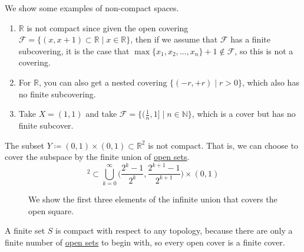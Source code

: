   \begin{example}
    \label{ex:non-compact-spaces}
    We show some examples of non-compact spaces. 
    \begin{enumerate}
      \item $\mathbb{R}$ is not compact since given the open covering $\mathcal{F} = \{ (x, x + 1) \subset \mathbb{R} \mid x \in \mathbb{R} \}$, then if we assume that $\mathcal{F}$ has a finite subcovering, it is the case that $\max\{x_1, x _2, \ldots, x_n \} + 1 \not\in \mathcal{F}$, so this is not a covering. 
      \item For $\mathbb{R}$, you can also get a nested covering $\{(-r, +r) \mid r > 0\}$, which also has no finite subcovering. 

      \item Take $X = (1, 1)$ and take $\mathcal{F} = \{ (\frac{1}{n}, 1] \mid n \in \mathbb{N} \}$, which is a cover but has no finite subcover. 
    \end{enumerate}
  \end{example}

  \begin{example}
    \label{ex:open-square-is-not-compact}
    The subset $Y \coloneqq (0,1) \times (0,1) \subset \mathbb{R}^2$ is not compact. That is, we can choose to cover the subspace by the finite union of \hyperref[def:open-set]{open sets}. 
    \begin{equation}
      [0,1]^2 \subset \bigcup_{k=0}^\infty \Big( \frac{2^k - 1}{2^k}, \frac{2^{k+1} - 1}{2^{k+1}} \Big) \times (0,1)
    \end{equation}

    \begin{figure}[H]
      \centering 
      \caption{We show the first three elements of the infinite union that covers the open square. }
      \label{fig:closed_square_compact}
    \end{figure}
  \end{example}

  \begin{example}
    \label{ex:finite-sets-are-always-compact}
    A finite set $S$ is compact with respect to any topology, because there are only a finite number of \hyperref[def:open-set]{open sets} to begin with, so every open cover is a finite cover. 
  \end{example}

